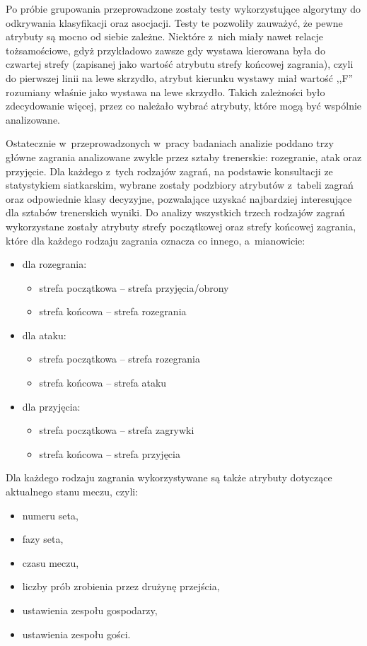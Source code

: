\documentclass[a4paper,twoside,12pt]{book}
\begin{document}
Po próbie grupowania przeprowadzone zostały testy wykorzystujące algorytmy do odkrywania klasyfikacji oraz asocjacji. Testy te pozwoliły zauważyć, że pewne atrybuty są mocno od siebie zależne. Niektóre z~nich miały nawet relacje tożsamościowe, gdyż przykładowo zawsze gdy wystawa kierowana była do czwartej strefy (zapisanej jako wartość atrybutu strefy końcowej zagrania), czyli do pierwszej linii na lewe skrzydło, atrybut kierunku wystawy miał wartość ,,F'' rozumiany właśnie jako wystawa na lewe skrzydło. Takich zależności było zdecydowanie więcej, przez co należało wybrać atrybuty, które mogą być wspólnie analizowane. 

Ostatecznie w~przeprowadzonych w~pracy badaniach analizie poddano trzy główne zagrania analizowane zwykle przez sztaby trenerskie: rozegranie, atak oraz przyjęcie. Dla każdego z~tych rodzajów zagrań, na podstawie konsultacji ze statystykiem siatkarskim, wybrane zostały podzbiory atrybutów z~tabeli zagrań oraz odpowiednie klasy decyzyjne, pozwalające uzyskać najbardziej interesujące dla sztabów trenerskich wyniki. Do analizy wszystkich trzech rodzajów zagrań wykorzystane zostały atrybuty strefy początkowej oraz strefy końcowej zagrania, które dla każdego rodzaju zagrania oznacza co innego, a~mianowicie:
\begin{itemize}
\item dla rozegrania:
\begin{itemize}
\item strefa początkowa -- strefa przyjęcia/obrony
\item strefa końcowa -- strefa rozegrania
\end{itemize}
\item dla ataku:
\begin{itemize}
\item strefa początkowa -- strefa rozegrania
\item strefa końcowa -- strefa ataku
\end{itemize}
\item dla przyjęcia:
\begin{itemize}
\item strefa początkowa -- strefa zagrywki
\item strefa końcowa -- strefa przyjęcia
\end{itemize}
\end{itemize}
Dla każdego rodzaju zagrania wykorzystywane są także atrybuty dotyczące aktualnego stanu meczu, czyli: 
\begin{itemize}
\item numeru seta,
\item fazy seta,
\item czasu meczu,
\item liczby prób zrobienia przez drużynę przejścia,
\item ustawienia zespołu gospodarzy,
\item ustawienia zespołu gości.
\end{itemize}
\end{document}
